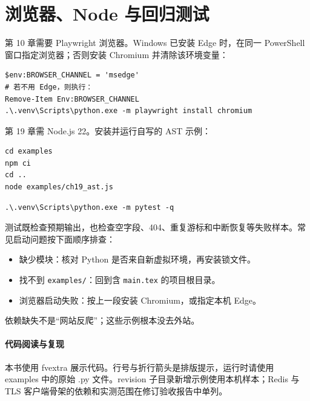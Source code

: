 \section*{浏览器、Node 与回归测试}
第 10 章需要 Playwright 浏览器。Windows 已安装 Edge 时，在同一 PowerShell 窗口指定浏览器；否则安装 Chromium 并清除该环境变量：
\begin{Verbatim}[numbers=none]
$env:BROWSER_CHANNEL = 'msedge'
# 若不用 Edge，则执行：
Remove-Item Env:BROWSER_CHANNEL
.\.venv\Scripts\python.exe -m playwright install chromium
\end{Verbatim}
第 19 章需 Node.js 22。安装并运行自写的 AST 示例：
\begin{Verbatim}[numbers=none]
cd examples
npm ci
cd ..
node examples/ch19_ast.js
\end{Verbatim}

\begin{Verbatim}[numbers=none]
.\.venv\Scripts\python.exe -m pytest -q
\end{Verbatim}
测试既检查预期输出，也检查空字段、404、重复游标和中断恢复等失败样本。常见启动问题按下面顺序排查：
\begin{itemize}
\item 缺少模块：核对 Python 是否来自新虚拟环境，再安装锁文件。
\item 找不到 \texttt{examples/}：回到含 \texttt{main.tex} 的项目根目录。
\item 浏览器启动失败：按上一段安装 Chromium，或指定本机 Edge。
\end{itemize}
依赖缺失不是“网站反爬”；这些示例根本没去外站。

\paragraph{代码阅读与复现} 本书使用 fvextra 展示代码。行号与折行箭头是排版提示，运行时请使用 examples 中的原始 .py 文件。revision 子目录新增示例使用本机样本；Redis 与 TLS 客户端骨架的依赖和实测范围在修订验收报告中单列。
